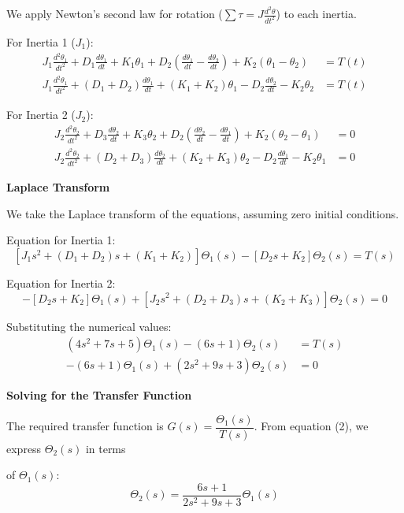 \documentclass[11pt]{article}
\begin{document}
\noindent We apply Newton's second law for rotation ($\sum \tau = J \frac{d^2\theta}{dt^2}$) to each inertia.

\vspace{5pt}
{For Inertia 1 ($J_1$):}
\begin{align*}
    J_1 \frac{d^2\theta_1}{dt^2} + D_1 \frac{d\theta_1}{dt} + K_1 \theta_1 + D_2\left(\frac{d\theta_1}{dt} - \frac{d\theta_2}{dt}\right) + K_2(\theta_1 - \theta_2) &= T(t) \\
    J_1 \frac{d^2\theta_1}{dt^2} + (D_1 + D_2)\frac{d\theta_1}{dt} + (K_1 + K_2)\theta_1 - D_2\frac{d\theta_2}{dt} - K_2\theta_2 &= T(t)
\end{align*}

{For Inertia 2 ($J_2$):}
\begin{align*}
    J_2 \frac{d^2\theta_2}{dt^2} + D_3 \frac{d\theta_2}{dt} + K_3 \theta_2 + D_2\left(\frac{d\theta_2}{dt} - \frac{d\theta_1}{dt}\right) + K_2(\theta_2 - \theta_1) &= 0 \\
    J_2 \frac{d^2\theta_2}{dt^2} + (D_2 + D_3)\frac{d\theta_2}{dt} + (K_2 + K_3)\theta_2 - D_2\frac{d\theta_1}{dt} - K_2\theta_1 &= 0
\end{align*}

\newpage
\noindent\textbf{Laplace Transform}
\vspace{12pt}

We take the Laplace transform of the equations, assuming zero initial conditions.
\vspace{5pt}

Equation for Inertia 1:
\[
[J_1 s^2 + (D_1 + D_2)s + (K_1 + K_2)]\Theta_1(s) - [D_2s + K_2]\Theta_2(s) = T(s)
\]

Equation for Inertia 2:
\[
-[D_2s + K_2]\Theta_1(s) + [J_2 s^2 + (D_2 + D_3)s + (K_2 + K_3)]\Theta_2(s) = 0
\]

Substituting the numerical values:
\begin{align}
    (4s^2 + 7s + 5)\Theta_1(s) - (6s + 1)\Theta_2(s) &= T(s) \tag{1} \\
    -(6s + 1)\Theta_1(s) + (2s^2 + 9s + 3)\Theta_2(s) &= 0 \tag{2}
\end{align}

\noindent\textbf{Solving for the Transfer Function}
\vspace{8pt}

The required transfer function is $G(s) = \dfrac{\Theta_1(s)}{T(s)}$. From equation (2), we express $\Theta_2(s)$ in terms

of $\Theta_1(s)$:
\[
\Theta_2(s) = \frac{6s + 1}{2s^2 + 9s + 3} \Theta_1(s)
\]
\end{document}
